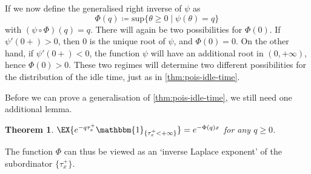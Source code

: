 \documentclass[titlepage]{article}
\theoremstyle{plain}
\newtheorem{theorem}{Theorem}[section]
\theoremstyle{definition}
\begin{document}
If we now define the generalised right inverse of $\psi$ as
\begin{equation}
  \Phi(q) \coloneqq \mathrm{sup}\{ \theta \geq 0 \mid \psi(\theta) = q \} \,
\end{equation}
with $(\psi \circ \Phi)(q) = q$. There will again be two possibilities for $\Phi(0)$. If $\psi'(0+) > 0$, then $0$ is the unique root of $\psi$, and $\Phi(0) = 0$. On the other hand, if $\psi'(0+) < 0$, the function $\psi$ will have an additional root in $(0, +\infty)$, hence $\Phi(0) > 0$. These two regimes will determine two different possibilities for the distribution of the idle time, just as in \cref{thm:pois-idle-time}.

Before we can prove a generalisation of \cref{thm:pois-idle-time}, we still need one additional lemma.

\begin{theorem} \label{thm:inverse-laplace-exp}
  $\EX{e^{-q \tau_x^+} \mathbbm{1}_{\{ \tau_x^+ < +\infty \}}} = e^{-\Phi(q) x}$ for any $q \geq 0$.
\end{theorem}

The function $\Phi$ can thus be viewed as an `inverse Laplace exponent' of the subordinator $\{ \tau_x^+ \}$.
\end{document}
